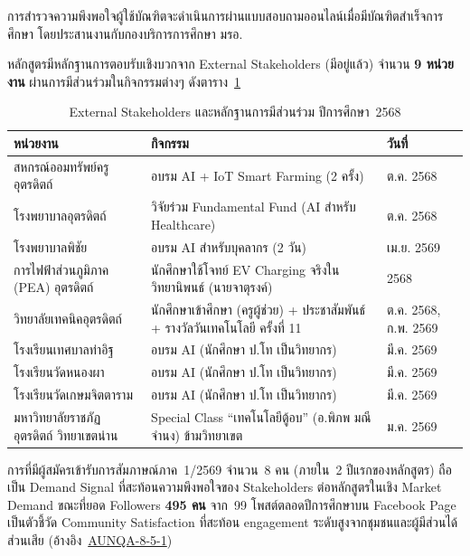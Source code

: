 การสำรวจความพึงพอใจผู้ใช้บัณฑิตจะดำเนินการผ่านแบบสอบถามออนไลน์เมื่อมีบัณฑิตสำเร็จการศึกษา โดยประสานงานกับกองบริการการศึกษา มรอ.

หลักสูตรมีหลักฐานการตอบรับเชิงบวกจาก External Stakeholders (มีอยู่แล้ว) จำนวน \textbf{9 หน่วยงาน} ผ่านการมีส่วนร่วมในกิจกรรมต่างๆ ดังตาราง~\ref{tbl:external_sh_engagement}

\begin{table}[H]
  \centering
  \caption{External Stakeholders และหลักฐานการมีส่วนร่วม ปีการศึกษา~2568}
  \label{tbl:external_sh_engagement}
  \begingroup
  \footnotesize
  \setlength{\tabcolsep}{3pt}
  \renewcommand{\arraystretch}{1.2}
  \begin{tabularx}{\linewidth}{|>{\raggedright\arraybackslash}X|>{\raggedright\arraybackslash}X|l|}
    \hline
    \textbf{หน่วยงาน} & \textbf{กิจกรรม} & \textbf{วันที่} \\
    \hline
    สหกรณ์ออมทรัพย์ครูอุตรดิตถ์ & อบรม AI + IoT Smart Farming (2 ครั้ง) & ต.ค. 2568 \\
    \hline
    โรงพยาบาลอุตรดิตถ์ & วิจัยร่วม Fundamental Fund (AI สำหรับ Healthcare) & ต.ค. 2568 \\
    \hline
    โรงพยาบาลพิชัย & อบรม AI สำหรับบุคลากร (2 วัน) & เม.ย. 2569 \\
    \hline
    การไฟฟ้าส่วนภูมิภาค (PEA) อุตรดิตถ์ & นักศึกษาใช้โจทย์ EV Charging จริงในวิทยานิพนธ์ (นายจาตุรงค์) & 2568 \\
    \hline
    วิทยาลัยเทคนิคอุตรดิตถ์ & นักศึกษาเข้าศึกษา (ครูผู้ช่วย) + ประชาสัมพันธ์ + รางวัลวันเทคโนโลยี ครั้งที่ 11 & ต.ค. 2568, ก.พ. 2569 \\
    \hline
    โรงเรียนเทศบาลท่าอิฐ & อบรม AI (นักศึกษา ป.โท เป็นวิทยากร) & มี.ค. 2569 \\
    \hline
    โรงเรียนวัดหนองผา & อบรม AI (นักศึกษา ป.โท เป็นวิทยากร) & มี.ค. 2569 \\
    \hline
    โรงเรียนวัดเกษมจิตตาราม & อบรม AI (นักศึกษา ป.โท เป็นวิทยากร) & มี.ค. 2569 \\
    \hline
    มหาวิทยาลัยราชภัฏอุตรดิตถ์ วิทยาเขตน่าน & Special Class ``เทคโนโลยีตู้อบ'' (อ.พิภพ มณีจำนง) ข้ามวิทยาเขต & ม.ค. 2569 \\
    \hline
  \end{tabularx}
  \endgroup
\end{table}

การที่มีผู้สมัครเข้ารับการสัมภาษณ์ภาค~1/2569 จำนวน~8 คน (ภายใน~2 ปีแรกของหลักสูตร) ถือเป็น Demand Signal ที่สะท้อนความพึงพอใจของ Stakeholders ต่อหลักสูตรในเชิง Market Demand ขณะที่ยอด Followers \textbf{495 คน} จาก~99 โพสต์ตลอดปีการศึกษาบน Facebook Page เป็นตัวชี้วัด Community Satisfaction ที่สะท้อน engagement ระดับสูงจากชุมชนและผู้มีส่วนได้ส่วนเสีย (อ้างอิง~\hyperlink{ref:AUNQA-8-5-1}{AUNQA-8-5-1})

